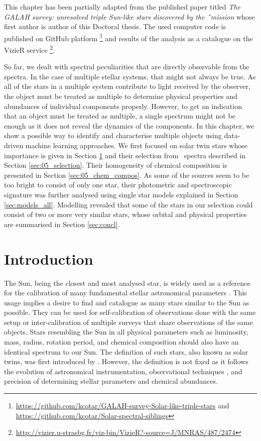 This chapter has been partially adapted from the published paper titled \textit{The GALAH survey: unresolved triple Sun-like stars discovered by the \G\ mission} \cite{2019MNRAS.487.2474C} whose first author is author of this Doctoral thesis. The used computer code is published on GitHub platform  \footnote{\url{https://github.com/kcotar/GALAH-survey-Solar-like-triple-stars} and \url{https://github.com/kcotar/Solar-spectral-siblings}} and results of the analysis as a catalogue on the VizieR service  \footnote{\url{http://vizier.u-strasbg.fr/viz-bin/VizieR?-source=J/MNRAS/487/2474}}.

So far, we dealt with spectral peculiarities that are directly observable from the spectra. In the case of multiple stellar systems, that might not always be true. As all of the stars in a multiple system contribute to light received by the observer, the object must be treated as multiple to determine physical properties and abundances of individual components properly. However, to get an indication that an object must be treated as multiple, a single spectrum might not be enough as it does not reveal the dynamics of the components. In this chapter, we show a possible way to identify and characterise multiple objects using data-driven machine learning approaches. We first focused on solar twin stars whose importance is given in Section \ref{sec:intro_solar} and their selection from \Gh\ spectra described in Section \ref{sec:05_selection}. Their homogeneity of chemical composition is presented in Section \ref{sec:05_chem_compos}. As some of the sources seem to be too bright to consist of only one star, their photometric and spectroscopic signature was further analysed using single star models explained in Section \ref{sec:models_all}. Modelling revealed that some of the stars in our selection could consist of two or more very similar stars, whose orbital and physical properties are summarised in Section \ref{sec:concl}.
 

\section{Introduction}
\label{sec:intro_solar}
The Sun, being the closest and most analysed star, is widely used as a reference for the calibration of many fundamental stellar astronomical parameters \cite{2010A&A...522A..98M, 2012MNRAS.426..484D}. This usage implies a desire to find and catalogue as many stars similar to the Sun as possible. They can be used for self-calibration of observations done with the same setup or inter-calibration of multiple surveys that share observations of the same objects. Stars resembling the Sun in all physical parameters such as luminosity, mass, radius, rotation period, and chemical composition should also have an identical spectrum to our Sun. The definition of such stars, also known as solar twins, was first introduced by \citet{1981A&A....94....1C}. However, the definition is not fixed as it follows the evolution of astronomical instrumentation, observational techniques \cite{2017AN....338..442A}, and precision of determining stellar parameters and chemical abundances.

